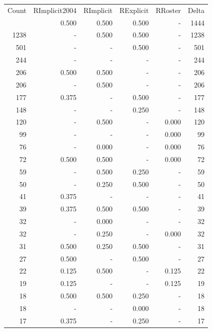 \documentclass[a4paper]{article}\usepackage[]{graphicx}\usepackage[]{color}
\begin{document}
\begin{table}[ht]
\centering
\begin{tabular}{rrrrrr}
  \hline
Count & RImplicit2004 & RImplicit & RExplicit & RRoster & Delta \\ 
  \rowcolor{goodColor}  \hline
1444 & 0.500 & 0.500 & 0.500 & - & 1444 \\ 
   \rowcolor{goodColor} 1238 & - & 0.500 & 0.500 & - & 1238 \\ 
   \rowcolor{sosoColor} 501 & - & - & 0.500 & - & 501 \\ 
   \rowcolor{nullColor} 244 & - & - & - & - & 244 \\ 
  206 & 0.500 & 0.500 & - & - & 206 \\ 
  206 & - & 0.500 & - & - & 206 \\ 
   \rowcolor{sosoColor} 177 & 0.375 & - & 0.500 & - & 177 \\ 
   \rowcolor{sosoColor} 148 & - & - & 0.250 & - & 148 \\ 
  120 & - & 0.500 & - & 0.000 & 120 \\ 
   \rowcolor{nullColor} 99 & - & - & - & 0.000 & 99 \\ 
  76 & - & 0.000 & - & 0.000 & 76 \\ 
  72 & 0.500 & 0.500 & - & 0.000 & 72 \\ 
   \rowcolor{badColor} 59 & - & 0.500 & 0.250 & - & 59 \\ 
   \rowcolor{badColor} 50 & - & 0.250 & 0.500 & - & 50 \\ 
   \rowcolor{nullColor} 41 & 0.375 & - & - & - & 41 \\ 
   \rowcolor{goodColor} 39 & 0.375 & 0.500 & 0.500 & - & 39 \\ 
  32 & - & 0.000 & - & - & 32 \\ 
  32 & - & 0.250 & - & 0.000 & 32 \\ 
   \rowcolor{badColor} 31 & 0.500 & 0.250 & 0.500 & - & 31 \\ 
   \rowcolor{sosoColor} 27 & 0.500 & - & 0.500 & - & 27 \\ 
  22 & 0.125 & 0.500 & - & 0.125 & 22 \\ 
   \rowcolor{nullColor} 19 & 0.125 & - & - & 0.125 & 19 \\ 
   \rowcolor{badColor} 18 & 0.500 & 0.500 & 0.250 & - & 18 \\ 
   \rowcolor{sosoColor} 18 & - & - & 0.000 & - & 18 \\ 
   \rowcolor{sosoColor} 17 & 0.375 & - & 0.250 & - & 17 \\ 

\end{tabular}
\end{table}
\end{document}
